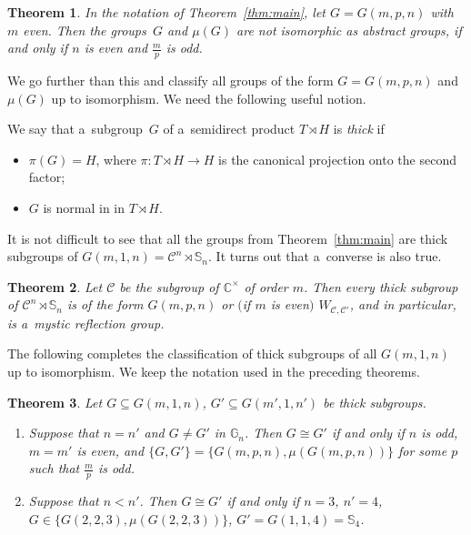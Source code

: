 \documentclass[pdftex]{sigma}
\newtheorem{Theorem}{Theorem}[section]
\begin{document}
\begin{Theorem}
\label{thm:not iso}
In the notation of Theorem~{\rm \ref{thm:main}}, let $G=G(m,p,n)$ with $m$ even.
Then the groups~$G$ and $\mu(G)$ are not
isomorphic as abstract groups, if and only if $n$ is even and $\frac mp$ is odd.
\end{Theorem}



We go further than this and classify all groups of the form $G=G(m,p,n)$ and $\mu(G)$ up to isomorphism.
We need the following useful notion.

\begin{Definition}
We say that a~subgroup~$G$ of a~semidirect product $T\rtimes H$ is \textit{thick} if
\begin{itemize}
\item
$\pi(G)=H$, where $\pi\colon T\rtimes H \to H$ is the canonical projection onto the second factor;
\item
$G$ is normal in in $T\rtimes H$.
\end{itemize}
\end{Definition}
It is not dif\/f\/icult to see that all the groups from Theorem~\ref{thm:main} are thick subgroups of $G(m,1,n) ={\mathcal
C}^n\rtimes \mathbb S_n$.
It turns out that a~converse is also true.

\begin{Theorem}
\label{thm:thick}
Let ${\mathcal C}$ be the subgroup of $\mathbb C^\times$ of order $m$.
Then every thick subgroup of ${\mathcal C}^n \rtimes \mathbb S_n$ is of the form $G(m,p,n)$ or $($if $m$ is even$)$
$W_{{\mathcal C},{\mathcal C}'}$, and in particular, is a~mystic reflection group.
\end{Theorem}

The following completes the classif\/ication of thick subgroups of all $G(m,1,n)$ up to isomorphism.
We keep the notation used in the preceding theorems.

\begin{Theorem}
\label{thm:classification}
Let $G\subseteq G(m,1,n)$, $G'\subseteq G(m',1,n')$ be thick subgroups.
\begin{enumerate}\itemsep=0pt
\item[$(a)$] Suppose that $n=n'$ and $G\ne G'$ in $\mathbb G_n$.
Then $G\cong G'$ if and only if $n$ is odd, $m=m'$ is even, and $\{G,G'\}=\{G(m,p,n),\mu(G(m,p,n))\}$ for some $p$ such
that $\frac{m}{p}$ is odd.

\item[$(b)$] Suppose that $n\!<\!n'$.
Then $G\cong G'$ if and only if $n\!=\!3$, $n'\!=\!4$, $G\!\in\!\{G(2,2,3),\mu(G(2,2,3))\}$, $G'=G(1,1,4)=\mathbb S_4$.
\end{enumerate}
\end{Theorem}
\end{document}
